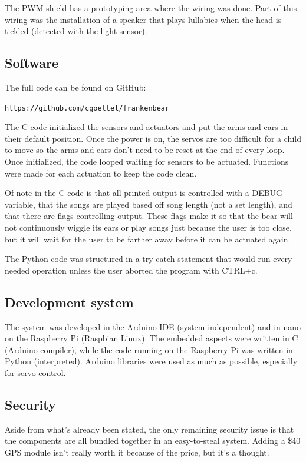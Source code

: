 \documentclass{article}
\begin{document}
The PWM shield has a prototyping area where the wiring was done. Part of this wiring was the installation of a speaker that plays lullabies when the head is tickled (detected with the light sensor).

\subsection{Software}
The full code can be found on GitHub:

\hfil\texttt{https://github.com/cgoettel/frankenbear}\hfil

The C code initialized the sensors and actuators and put the arms and ears in their default position. Once the power is on, the servos are too difficult for a child to move so the arms and ears don't need to be reset at the end of every loop. Once initialized, the code looped waiting for sensors to be actuated. Functions were made for each actuation to keep the code clean.

Of note in the C code is that all printed output is controlled with a DEBUG variable, that the songs are played based off song length (not a set length), and that there are flags controlling output. These flags make it so that the bear will not continuously wiggle its ears or play songs just because the user is too close, but it will wait for the user to be farther away before it can be actuated again.

The Python code was structured in a try-catch statement that would run every needed operation unless the user aborted the program with CTRL+c.

\subsection{Development system}
The system was developed in the Arduino IDE (system independent) and in nano on the Raspberry Pi (Raspbian Linux). The embedded aspects were written in C (Arduino compiler), while the code running on the Raspberry Pi was written in Python (interpreted). Arduino libraries were used as much as possible, especially for servo control.

\subsection{Security}
Aside from what's already been stated, the only remaining security issue is that the components are all bundled together in an easy-to-steal system. Adding a \$40 GPS module isn't really worth it because of the price, but it's a thought.
\end{document}
